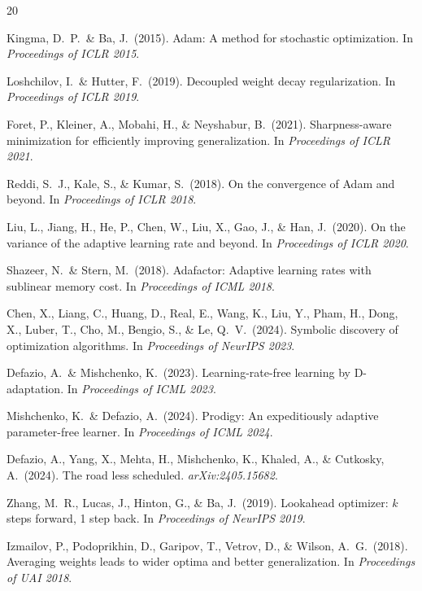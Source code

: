 \documentclass[12pt]{article}
\begin{document}
\begin{thebibliography}{20}

Kingma, D.~P.\ \& Ba, J.\ (2015).
Adam: A method for stochastic optimization.
In \textit{Proceedings of ICLR 2015}.

Loshchilov, I.\ \& Hutter, F.\ (2019).
Decoupled weight decay regularization.
In \textit{Proceedings of ICLR 2019}.

Foret, P., Kleiner, A., Mobahi, H., \& Neyshabur, B.\ (2021).
Sharpness-aware minimization for efficiently improving generalization.
In \textit{Proceedings of ICLR 2021}.

Reddi, S.~J., Kale, S., \& Kumar, S.\ (2018).
On the convergence of Adam and beyond.
In \textit{Proceedings of ICLR 2018}.

Liu, L., Jiang, H., He, P., Chen, W., Liu, X., Gao, J., \& Han, J.\ (2020).
On the variance of the adaptive learning rate and beyond.
In \textit{Proceedings of ICLR 2020}.

Shazeer, N.\ \& Stern, M.\ (2018).
Adafactor: Adaptive learning rates with sublinear memory cost.
In \textit{Proceedings of ICML 2018}.

Chen, X., Liang, C., Huang, D., Real, E., Wang, K., Liu, Y.,
Pham, H., Dong, X., Luber, T., Cho, M., Bengio, S., \& Le, Q.~V.\ (2024).
Symbolic discovery of optimization algorithms.
In \textit{Proceedings of NeurIPS 2023}.

Defazio, A.\ \& Mishchenko, K.\ (2023).
Learning-rate-free learning by D-adaptation.
In \textit{Proceedings of ICML 2023}.

Mishchenko, K.\ \& Defazio, A.\ (2024).
Prodigy: An expeditiously adaptive parameter-free learner.
In \textit{Proceedings of ICML 2024}.

Defazio, A., Yang, X., Mehta, H., Mishchenko, K., Khaled, A.,
\& Cutkosky, A.\ (2024).
The road less scheduled.
\textit{arXiv:2405.15682}.

Zhang, M.~R., Lucas, J., Hinton, G., \& Ba, J.\ (2019).
Lookahead optimizer: $k$ steps forward, 1 step back.
In \textit{Proceedings of NeurIPS 2019}.

Izmailov, P., Podoprikhin, D., Garipov, T., Vetrov, D., \&
Wilson, A.~G.\ (2018).
Averaging weights leads to wider optima and better generalization.
In \textit{Proceedings of UAI 2018}.


\end{thebibliography}
\end{document}
